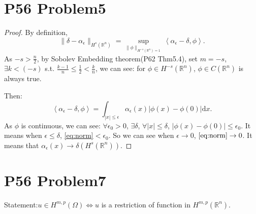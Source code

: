 \documentclass[a4paper]{ctexart}
\newcommand{\dif}{\mathrm{d}}
\newcommand{\innerprod}[2]{\left<#1,#2\right>}
\begin{document}
\section*{P56 Problem5}
\begin{proof}
    By definition, 
    \begin{equation}
        \|\delta-\alpha_{\epsilon}\|_{H^{s}(\mathbb{R}^{n})}=\sup_{\|\phi\|_{H^{-s}(\mathbb{R}^{n})=1}}\innerprod{\alpha_{\epsilon}-\delta}{\phi}.
    \end{equation}
    As $-s>\frac{n}{2}$, by Sobolev Embedding theorem(P62 Thm5.4), 
    set $m=-s$, $\exists k<(-s)$ s.t. $\frac{k-1}{n}\le\frac{1}{2}<\frac{k}{n}$, we can see: for $\phi\in H^{-s}(\mathbb{R}^{n})$, $\phi\in C(\mathbb{R}^{n})$ is always true.

    Then:
    \begin{equation}
        \label{eq:norm}
        \innerprod{\alpha_{\epsilon}-\delta}{\phi}=\int_{|x|\le\epsilon}\alpha_{\epsilon}(x)|\phi(x)-\phi(0)|\dif x.
    \end{equation}
    As $\phi$ is continuous, we can see: $\forall\epsilon_{0}>0$, $\exists\delta$, $\forall|x|\le\delta$, $|\phi(x)-\phi(0)|\le\epsilon_{0}$. It means when $\epsilon\le\delta$, \eqref{eq:norm}$<\epsilon_{0}$. So we can see when $\epsilon\rightarrow 0$, $\eqref{eq:norm}\rightarrow 0$. It means that $\alpha_{\epsilon}(x)\rightarrow\delta(H^{s}(\mathbb{R}^{n}))$.
\end{proof}
\section*{P56 Problem7}
Statement:$u\in H^{m,p}(\Omega)\Leftrightarrow u$ is a restriction of function in $H^{m,p}(\mathbb{R}^n)$.
\end{document}
